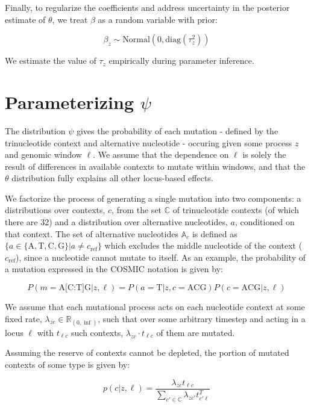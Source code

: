 \documentclass{article}
\begin{document}
Finally, to regularize the coefficients and address uncertainty in the posterior estimate of $\theta$, we treat $\beta$ as a random variable with prior:

\begin{equation}
\beta_{z} \sim \textrm{Normal}(0,\textrm{diag}(\tau^2_z))
\end{equation}

We estimate the value of $\tau_z$ empirically during parameter inference.

\section{Parameterizing $\psi$}

The distribution $\psi$ gives the probability of each mutation - defined by the trinucleotide context and alternative nucleotide - occuring given some process $z$ and genomic window $\ell$. We assume that the dependence on $\ell$ is solely the result of differences in available contexts to mutate within windows, and that the $\theta$ distribution fully explains all other locus-based effects.

We factorize the process of generating a single mutation into two components: a distributions over contexts, $c$, from the set $\mathbb{C}$ of trinucleotide contexts (of which there are 32) and a distribution over alternative nucleotides, $a$, conditioned on that context. The set of alternative nucleotides $\mathbb{A}_c$ is defined as $\{ a \in \{\mathrm{A, T, C, G}\} | a \neq c_{\mathrm{ref}}\}$ which excludes the middle nucleotide of the context ($c_{\mathrm{ref}}$), since a nucleotide cannot mutate to itself. As an example, the probability of a mutation expressed in the COSMIC notation is given by:

\begin{equation}
P(m = \textrm{A[C:T]G} | z, \ell) = P(a=\textrm{T} | z, c=\textrm{ACG}) P(c=\textrm{ACG} | z, \ell)
\end{equation}

We assume that each mutational process acts on each nucleotide context at some fixed rate, $\lambda_{zc} \in \mathbb{R}_{(0,\inf)}$, such that over some arbitrary timestep and acting in a locus $\ell$ with $ t_{\ell c}$ such contexts, $\lambda_{zc}\cdot t_{\ell c}$ of them are mutated.

Assuming the reserve of contexts cannot be depleted, the portion of mutated contexts of some type is given by:

\begin{equation}
p(c | z, \ell) = \frac{\lambda_{zc}t_{\ell c}}{\sum_{c'\in \mathbb{C}} \lambda_{zc'}t^{T}_{c' \ell}} 
\end{equation}
 
\end{document}

